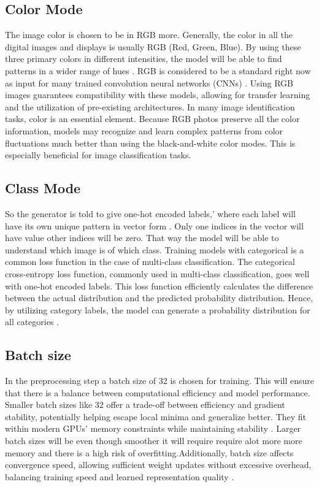 \documentclass[12pt,onecolumn]{report}
\begin{document}
\subsection{Color Mode}
The image color is chosen to be in RGB more. Generally, the color in all the digital images and displays is usually RGB (Red, Green, Blue). By using these three primary colors in different intensities, the model will be able to find patterns in a wider range of hues \cite{epackprinting_rgb}. RGB is considered to be a standard right now as input for many trained convolution neural networks (CNNs) \cite{dsp_rgb_hsv}. Using RGB images guarantees compatibility with these models, allowing for transfer learning and the utilization of pre-existing architectures. In many image identification tasks, color is an essential element. Because RGB photos preserve all the color information, models may recognize and learn complex patterns from color fluctuations much better than using the black-and-white color modes. This is especially beneficial for image classification tasks.

\subsection{Class Mode}
So the generator is told to give one-hot encoded labels,' where each label will have its own unique pattern in vector form \cite{loss_functions_image_classification}. Only one indices in the vector will have value other indices will be zero. That way the model will be able to understand which image is of which class. Training models with categorical is a common loss function in the case of multi-class classification.\cite{generalization_cross_entropy} The categorical cross-entropy loss function, commonly used in multi-class classification, goes well with one-hot encoded labels. This loss function efficiently calculates the difference between the actual distribution and the predicted probability distribution. Hence, by utilizing category labels, the model can generate a probability distribution for all categories \cite{robust_multiclass_classification}.

\subsection{Batch size}
In the preprocessing step a batch size of 32 is chosen for training. This will ensure that there is a balance between computational efficiency and model performance. Smaller batch sizes like 32 offer a trade-off between efficiency and gradient stability, potentially helping escape local minima and generalize better. They fit within modern GPUs’ memory constraints while maintaining stability \cite{keskar2017largebatchtrainingdeeplearning}. Larger batch sizes will be even though smoother it will require require alot more more memory and there is a high risk of overfitting.Additionally, batch size affects convergence speed, allowing sufficient weight updates without excessive overhead, balancing training speed and learned representation quality \cite{masters2018revisitingsmallbatchtraining}.
\end{document}
